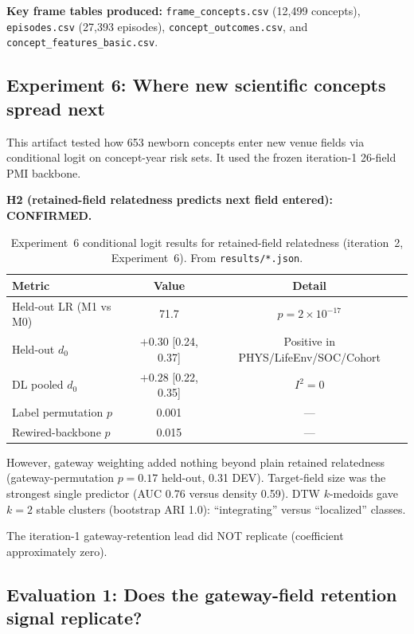 \documentclass[11pt,letterpaper]{article}
\begin{document}
\textbf{Key frame tables produced:} \texttt{frame\_concepts.csv} (12{,}499 concepts), \texttt{episodes.csv} (27{,}393 episodes), \texttt{concept\_outcomes.csv}, and \texttt{concept\_features\_basic.csv}.

\subsection{Experiment 6: Where new scientific concepts spread next}

This artifact tested how 653 newborn concepts enter new venue fields via conditional logit on concept-year risk sets. It used the frozen iteration-1 26-field PMI backbone.

\textbf{H2 (retained-field relatedness predicts next field entered): CONFIRMED.}

\begin{table}[!htbp]
\centering
\caption{Experiment~6 conditional logit results for retained-field relatedness (iteration~2, Experiment~6). From \texttt{results/*.json}.}
\label{tab:exp6_entry}
\small
\begin{tabular}{lcc}
\toprule
Metric & Value & Detail \\
\midrule
Held-out LR (M1 vs M0) & 71.7 & $p = 2 \times 10^{-17}$ \\
Held-out $d_0$ & $+0.30$ [0.24, 0.37] & Positive in PHYS/LifeEnv/SOC/Cohort \\
DL pooled $d_0$ & $+0.28$ [0.22, 0.35] & $I^2 = 0$ \\
Label permutation $p$ & 0.001 & --- \\
Rewired-backbone $p$ & 0.015 & --- \\
\bottomrule
\end{tabular}
\end{table}

However, gateway weighting added nothing beyond plain retained relatedness (gateway-permutation $p = 0.17$ held-out, 0.31 DEV). Target-field size was the strongest single predictor (AUC 0.76 versus density 0.59). DTW $k$-medoids gave $k = 2$ stable clusters (bootstrap ARI 1.0): ``integrating'' versus ``localized'' classes.

The iteration-1 gateway-retention lead did NOT replicate (coefficient approximately zero).

\subsection{Evaluation 1: Does the gateway-field retention signal replicate?}
\end{document}
